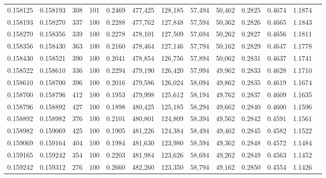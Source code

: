 \begin{tabular}{rrrrrrrrrrrrr}
0.158125 & 0.158193 &   308 & 101 &                                     0.2469 & 477,425 & 128,185 &  57,494 &  50,462 & 0.2825 & 0.4674 & 1.1874 \\
0.158193 & 0.158270 &   337 & 100 &                                     0.2288 & 477,762 & 127,848 &  57,594 &  50,362 & 0.2826 & 0.4665 & 1.1843 \\
0.158270 & 0.158356 &   339 & 100 &                                     0.2278 & 478,101 & 127,509 &  57,694 &  50,262 & 0.2827 & 0.4656 & 1.1811 \\
0.158356 & 0.158430 &   363 & 100 &                                     0.2160 & 478,464 & 127,146 &  57,794 &  50,162 & 0.2829 & 0.4647 & 1.1778 \\
0.158430 & 0.158521 &   390 & 100 &                                     0.2041 & 478,854 & 126,756 &  57,894 &  50,062 & 0.2831 & 0.4637 & 1.1741 \\
0.158522 & 0.158610 &   336 & 100 &                                     0.2294 & 479,190 & 126,420 &  57,994 &  49,962 & 0.2833 & 0.4628 & 1.1710 \\
0.158610 & 0.158700 &   396 & 100 &                                     0.2016 & 479,586 & 126,024 &  58,094 &  49,862 & 0.2835 & 0.4619 & 1.1674 \\
0.158700 & 0.158796 &   412 & 100 &                                     0.1953 & 479,998 & 125,612 &  58,194 &  49,762 & 0.2837 & 0.4609 & 1.1635 \\
0.158796 & 0.158892 &   427 & 100 &                                     0.1898 & 480,425 & 125,185 &  58,294 &  49,662 & 0.2840 & 0.4600 & 1.1596 \\
0.158892 & 0.158982 &   376 & 100 &                                     0.2101 & 480,801 & 124,809 &  58,394 &  49,562 & 0.2842 & 0.4591 & 1.1561 \\
0.158982 & 0.159069 &   425 & 100 &                                     0.1905 & 481,226 & 124,384 &  58,494 &  49,462 & 0.2845 & 0.4582 & 1.1522 \\
0.159069 & 0.159164 &   404 & 100 &                                     0.1984 & 481,630 & 123,980 &  58,594 &  49,362 & 0.2848 & 0.4572 & 1.1484 \\
0.159165 & 0.159242 &   354 & 100 &                                     0.2203 & 481,984 & 123,626 &  58,694 &  49,262 & 0.2849 & 0.4563 & 1.1452 \\
0.159242 & 0.159312 &   276 & 100 &                                     0.2660 & 482,260 & 123,350 &  58,794 &  49,162 & 0.2850 & 0.4554 & 1.1426 \\

\end{tabular}

